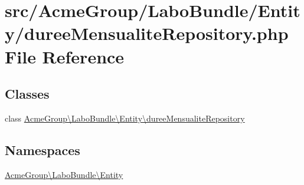 \hypertarget{duree_mensualite_repository_8php}{\section{src/\+Acme\+Group/\+Labo\+Bundle/\+Entity/duree\+Mensualite\+Repository.php File Reference}
\label{duree_mensualite_repository_8php}
}
\subsection*{Classes}
\begin{DoxyCompactItemize}
\item 
class \hyperlink{class_acme_group_1_1_labo_bundle_1_1_entity_1_1duree_mensualite_repository}{Acme\+Group\textbackslash{}\+Labo\+Bundle\textbackslash{}\+Entity\textbackslash{}duree\+Mensualite\+Repository}
\end{DoxyCompactItemize}
\subsection*{Namespaces}
\begin{DoxyCompactItemize}
\item 
 \hyperlink{namespace_acme_group_1_1_labo_bundle_1_1_entity}{Acme\+Group\textbackslash{}\+Labo\+Bundle\textbackslash{}\+Entity}
\end{DoxyCompactItemize}

